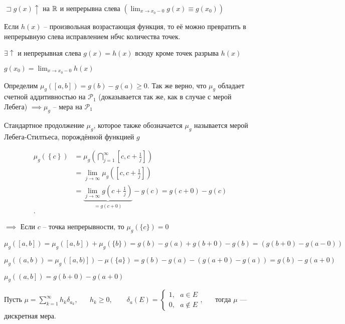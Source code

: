 $\sqsupset g(x)\uparrow$ на $\mathbb{R}$ и непрерывна слева $\left(\lim_{x \to x_0-0} g(x) \equiv g(x_0)\right)$

\begin{problem}
    Если $h(x)$ -- произвольная возрастающая функция, то её можно превратить в непрерывную слева исправлением нбчс количества точек.

    $\exists \uparrow$ и непрерывная слева $g(x) = h(x)$ всюду кроме точек разрыва $h(x)$
    
    $g(x_0) = \lim_{x \to x_0-0}h(x) $
\end{problem}

Определим $\mu_g ([a,b]) = g(b) - g(a) \geqslant 0 $. Так же верно, что $\mu_g$ обладает счетной аддитивностью на $\mathcal P_1$ (доказывается так же, как в случае с мерой Лебега) 
$\implies \mu_g $ -- мера на $\mathcal P_1$

Стандартное продолжение $\mu_g$, которое также обозначается $\mu_g$ называется мерой Лебега-Стилтьеса, порождённой функцией $g$

\begin{align*}
    \mu_g\left( \left\{ c \right\}  \right) &= \mu_g\left( \bigcap\limits_{j=1}^{\infty }[c, c + \frac{1}{j}]  \right)  \\
    &= \lim_{j \to \infty} \mu_g\left( [c, c + \frac{1}{j}] \right)  \\
    &= \underbrace{\lim_{j \to \infty} g(c + \frac{1}{j})}_{ = g(c + 0)} - g(c) = g(c+0) - g(c)  \\
.\end{align*}

$\implies $ Если $c$ -- точка непрерывности, то $\mu_g(\{c\}) = 0$

$\mu_g ([a, b]) = \mu_g([a, b]) + \mu_g(\{b \}) = g(b) - g(a) +g(b + 0) - g(b) = \left( g(b + 0) - g(a - 0)\right)$
    
$\mu_g\left( \left( a, b \right)  \right) = \mu_g\left( [a,b)] \right)  - \mu(\{a\}) = g(b) - g(a) - (g(a + 0) - g(a)) = g(b) - g(a+0) $

$\mu_g\left( \left( a, b \right] \right) = g(b + 0 ) - g(a + 0)$

\begin{definition}
    Пусть $\mu = \sum\limits_{k=1}^\infty h_k \delta_{a_k}$,~~~
    $h_k \geqslant 0$, ~~~ $\delta_a(E) = \begin{cases}
        1,~~~ a \in E\\
        0,~~~ a \not\in E
    \end{cases}$,~~~ тогда $\mu$ --- дискретная мера.

\end{definition}

